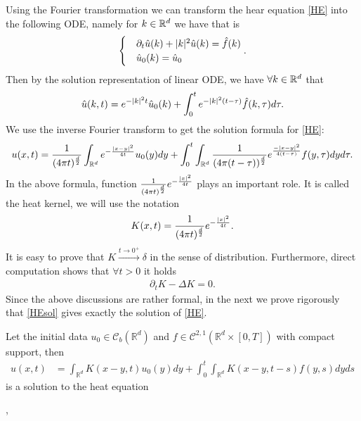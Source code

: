  Using the Fourier transformation we can transform the hear equation \autoref{HE} into the following ODE, namely for $k\in\mathbb{R}^d$ we have
 that is
 \begin{align*}
   \begin{cases}
     &\partial_t \hat{u}(k)  + \lvert k\rvert^2 \hat{u} (k) = \hat{f}(k) \\
     &\hat{u}_0(k)= \hat{u}_0
   \end{cases}
 .\end{align*}
Then by the solution representation of linear ODE, we have $\forall k\in\mathbb{R}^d$ that 
\begin{align*}
  \hat{u} (k,t)= e^{-\lvert k\rvert^2t} \hat{u}_0(k) + \int_0^{t}  e^{-\lvert k\rvert^2(t-\tau )} \hat{f}(k,\tau ) d \tau 
 .\end{align*}
We use the inverse Fourier transform to get the solution formula for \autoref{HE}:
\begin{align}\label{HEsol}
   u(x,t) =  \frac{1}{(4\pi t)^{\frac{d}{2}} }\int_{\mathbb{R}^{d} } e^{-\frac{\lvert x-y\rvert^2}{4t}} u_0(y) dy + \int_0^{t} \int_{\mathbb{R}^{d} }   \frac{1}{(4\pi(t-\tau ))^{\frac{d}{2}} } e^{\frac{-\lvert x-y\rvert^2}{4(t-\tau )}} f(y,\tau )dy d\tau 
 .\end{align}
In the above formula, function $\frac{1}{(4\pi t)^{\frac{d}{2}} } e^{-\frac{\lvert x\rvert^2}{4t}} $ plays an important role. It is called the heat kernel, we will use the notation 
	\begin{align*}
	K(x,t) = \frac{1}{(4\pi t)^{\frac{d}{2}} } e^{-\frac{\lvert x\rvert^2}{4t}} 
	.\end{align*}
It is easy to prove that $	K \xrightarrow{t \to 0^{+} } \delta $ in the sense of distribution. Furthermore, direct computation shows that $\forall  t > 0 $ it holds
	\begin{align*}
	\partial_t K - \Delta K  = 0
	.\end{align*}
Since the above discussions are rather formal, in the next we prove rigorously that \autoref{HEsol} gives exactly the solution of \autoref{HE}.


\begin{theorem}\label{solHE}
  Let the initial data $u_{0} \in \mathcal{C}_b(\mathbb{R}^{d} )$ and $f \in  \mathcal{C}^{2,1}(\mathbb{R}^{d} \times  [0,T]) $ with compact support, then
\begin{align*}
    u(x,t) &=  \int_{\mathbb{R}^{d} } K(x-y,t) u_0(y) dy + \int_0^{t} \int_{\mathbb{R}^{d} }  K(x-y,t-s) f(y,s)dy ds
  \end{align*}
  is a solution to the heat equation
\end{theorem}, 

